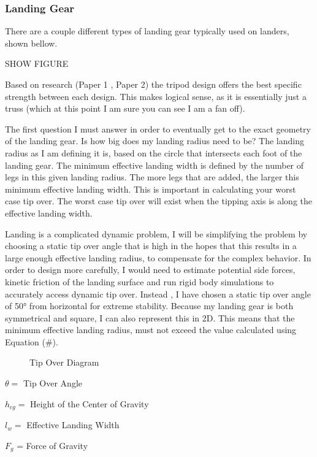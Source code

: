 \documentclass[12pt,letterpaper]{article}
\begin{document}
\subsubsection{Landing Gear}

There are a couple different types of landing gear typically used on landers, shown bellow.

SHOW FIGURE

Based on research (Paper 1 , Paper 2) the tripod design offers the best specific strength between each design. This makes logical sense, as it is essentially just a truss (which at this point I am sure you can see I am a fan off).

The first question I must answer in order to eventually get to the exact geometry of the landing gear. Is how big does my landing radius need to be? The landing radius as I am defining it is, based on the circle that intersects each foot of the landing gear. The minimum effective landing width is defined by the number of legs in this given landing radius. The more legs that are added, the larger this minimum effective landing width. This is important in calculating your worst case tip over. The worst case tip over will exist when the tipping axis is along the effective landing width.

Landing is a complicated dynamic problem, I will be simplifying the problem by choosing a static tip over angle that is high in the hopes that this results in a large enough effective landing radius, to compensate for the complex behavior. In order to design more carefully, I would need to estimate potential side forces, kinetic friction of the landing surface and run rigid body simulations to accurately access dynamic tip over. Instead , I have chosen a static tip over angle of 50\unit{\degree} from horizontal for extreme stability. Because my landing gear is both symmetrical and square, I can also represent this in 2D. This means that the minimum effective landing radius, must not exceed the value calculated using Equation (#).

\begin{figure}[h!]
\centering
\caption{Tip Over Diagram}
\end{figure}
\begin{description}
    \item $\theta = $ Tip Over Angle 
    \item $h_{cg} =$ Height of the Center of Gravity 
    \item $l_w = $ Effective Landing Width
    \item $F_g$ = Force of Gravity
\end{description}
\end{document}
